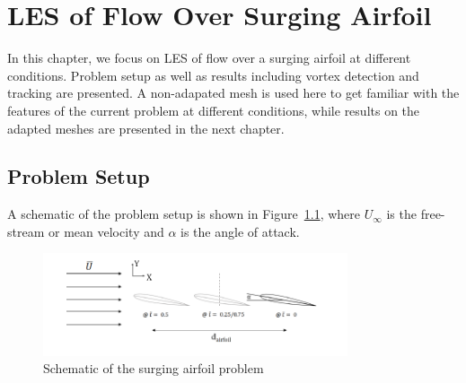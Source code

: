 \chapter{LES of Flow Over Surging Airfoil}
\label{chapter:baseline_results}

In this chapter, we focus on LES of flow over a surging airfoil at different conditions. Problem setup as well as results including vortex detection and tracking are presented. A non-adapated mesh is used here to get familiar with the features of the current problem at different conditions, while results on the adapted meshes are presented in the next chapter.



\section{Problem Setup}
\label{sec:problem_setup_baseline}


A schematic of the problem setup is shown in Figure~\ref{fig:SetUpSketch}, where $U_\infty$ is the free-stream or mean velocity and $\alpha$ is the angle of attack.

\begin{figure}[H]
\centering
\includegraphics[width=0.8\textwidth]{figures/Setup/Setup.png}
\caption{Schematic of the surging airfoil problem}
\label{fig:SetUpSketch}
\end{figure}

